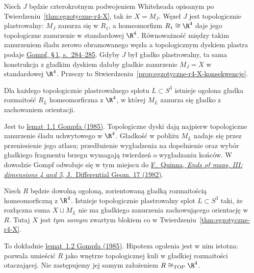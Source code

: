 \begin{przyklad}
\label{prz:egzotyczne-r4-J}
Niech $J$ będzie czterokrotnym podwojeniem
Whiteheada opisanym po
Twierdzeniu~\ref{thm:egzotyczne-r4-X}, tak że
$X=M_J$. Węzeł $J$ jest topologicznie
plastrowalny: $M_J$ zanurza się w $R_1$,
a homeomorfizm $R_1\cong\R^4$ daje jego
topologiczne zanurzenie w standardowej $\R^4$.
Równoważność między takim zanurzeniem śladu
zerowo obramowanego węzła a topologicznym
dyskiem plastra podaje
\href{https://doi.org/10.4310/jdg/1214439566}
{Gompf, \S\,1, s.~284--285}.
Gdyby $J$ był gładko plastrowalny, ta sama
konstrukcja z gładkim dyskiem dałaby gładkie
zanurzenie $M_J=X$ w standardowej $\R^4$.
Przeczy to
Stwierdzeniu~\ref{prop:egzotyczne-r4-X-konsekwencje}.
\end{przyklad}

\begin{twierdzenie}
\label{thm:egzotyczne-r4-slad}
Dla każdego topologicznie plastrowalnego splotu
$L\subset S^3$ istnieje ogolona gładka
rozmaitość $R_L$ homeomorficzna z $\R^4$,
w której $M_L$ zanurza się gładko z zachowaniem
orientacji.
\end{twierdzenie}

Jest to \href{https://doi.org/10.4310/jdg/1214439566}
{lemat~1.1 Gompfa (1985)}. Topologiczne dyski
dają najpierw topologiczne zanurzenie śladu
uchwytowego w $\R^4$. Gładkość w pobliżu
$M_L$ nadaje się przez przeniesienie jego atlasu;
przedłużenie wygładzenia na dopełnienie
oraz wybór gładkiego fragmentu brzegu wymagają
twierdzeń o wygładzaniu końców. W dowodzie
Gompf odwołuje się w tym miejscu do
\href{https://doi.org/10.4310/jdg/1214437139}
{F.~Quinna, \emph{Ends of maps, III: dimensions
4 and 5}, J.~Differential Geom. 17 (1982)}.

\begin{twierdzenie}
\label{thm:egzotyczne-r4-lemat}
Niech $R$ będzie dowolną ogoloną, zorientowaną
gładką rozmaitością homeomorficzną z $\R^4$.
Istnieje topologicznie plastrowalny splot
$L\subset S^3$ taki, że rozłączna suma
$X\sqcup M_L$ nie ma gładkiego zanurzenia
zachowującego orientację w $R$. Tutaj $X$
jest \emph{tym samym} zwartym blokiem co w
Twierdzeniu~\ref{thm:egzotyczne-r4-X}.
\end{twierdzenie}

To dokładnie \href{https://doi.org/10.4310/jdg/1214439566}
{lemat~1.2 Gompfa (1985)}. Hipoteza ogolenia
jest w nim istotna: pozwala umieścić $R$
jako wnętrze topologicznej kuli w gładkiej
rozmaitości otaczającej. Nie zastępujemy jej
samym założeniem $R\cong_{\mathrm{TOP}}\R^4$.

